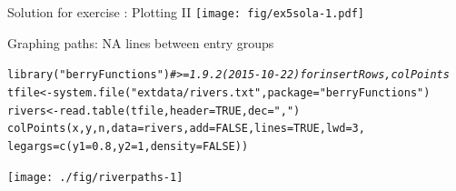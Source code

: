 \documentclass[xcolor=table,           xcolor=dvipsnames]{beamer}\usepackage[]{graphicx}\usepackage[]{color}
\makeatletter
\newcommand{\hlnum}[1]{\textcolor[rgb]{0,0,0}{#1}}
\newcommand{\hlstr}[1]{\textcolor[rgb]{0.545,0.137,0.137}{#1}}
\newcommand{\hlcom}[1]{\textcolor[rgb]{0,0.392,0}{\textit{#1}}}
\newcommand{\hlstd}[1]{\textcolor[rgb]{0,0,0}{#1}}
\newcommand{\hlkwb}[1]{\textcolor[rgb]{0,0,0}{#1}}
\newcommand{\hlkwc}[1]{\textcolor[rgb]{1,0,1}{#1}}
\newcommand{\hlkwd}[1]{\textcolor[rgb]{0,0,1}{#1}}
\newenvironment{kframe}{%
 \def\at@end@of@kframe{}%
 \ifinner\ifhmode%
  \def\at@end@of@kframe{\end{minipage}}%
  \begin{minipage}{\columnwidth}%
 \fi\fi%
 \def\FrameCommand##1{\hskip\@totalleftmargin \hskip-\fboxsep
 \colorbox{shadecolor}{##1}\hskip-\fboxsep
     \hskip-\linewidth \hskip-\@totalleftmargin \hskip\columnwidth}%
 \MakeFramed {\advance\hsize-\width
   \@totalleftmargin\z@ \linewidth\hsize
   \@setminipage}}%
 {\par\unskip\endMakeFramed%
 \at@end@of@kframe}
\newenvironment{knitrout}{}{} %
\newcounter{exercisecount}
\makeatother
\begin{document}

\begin{frame}[fragile]{Solution for exercise : Plotting II}
\texttt{[image: fig/ex5sola-1.pdf]}
\end{frame}


\begin{frame}[fragile]{Graphing paths: NA lines between entry groups}
\begin{knitrout}\scriptsize
{}\color{fgcolor}\begin{kframe}
\begin{alltt}
\hlkwd{library}\hlstd{(}\hlstr{"berryFunctions"}\hlstd{)} \hlcom{# >= 1.9.2 (2015-10-22) for insertRows, colPoints}
\hlstd{tfile} \hlkwb{<-} \hlkwd{system.file}\hlstd{(}\hlstr{"extdata/rivers.txt"}\hlstd{,} \hlkwc{package}\hlstd{=}\hlstr{"berryFunctions"}\hlstd{)}
\hlstd{rivers} \hlkwb{<-} \hlkwd{read.table}\hlstd{(tfile,} \hlkwc{header}\hlstd{=}\hlnum{TRUE}\hlstd{,} \hlkwc{dec}\hlstd{=}\hlstr{","}\hlstd{)}
\hlkwd{colPoints}\hlstd{(x,y,n,} \hlkwc{data}\hlstd{=rivers,} \hlkwc{add}\hlstd{=}\hlnum{FALSE}\hlstd{,} \hlkwc{lines}\hlstd{=}\hlnum{TRUE}\hlstd{,} \hlkwc{lwd}\hlstd{=}\hlnum{3}\hlstd{,}
          \hlkwc{legargs}\hlstd{=}\hlkwd{c}\hlstd{(}\hlkwc{y1}\hlstd{=}\hlnum{0.8}\hlstd{,}\hlkwc{y2}\hlstd{=}\hlnum{1}\hlstd{,} \hlkwc{density}\hlstd{=}\hlnum{FALSE}\hlstd{) )}
\end{alltt}
\end{kframe}

{\centering \texttt{[image: ./fig/riverpaths-1]} 

}



\end{knitrout}
\end{frame}

\end{document}
